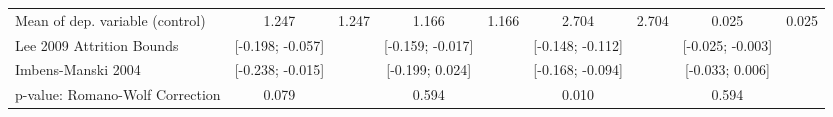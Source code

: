 {\begin{tabular}{l*{8}{c}}
Mean of dep. variable (control)                   &       1.247         &       1.247         &       1.166         &       1.166         &       2.704         &       2.704         &       0.025         &       0.025         \\
Lee 2009 Attrition Bounds                         &[-0.198; -0.057]         &                     &[-0.159; -0.017]         &                     &[-0.148; -0.112]         &                     &[-0.025; -0.003]         &                     \\
Imbens-Manski 2004                                &[-0.238; -0.015]         &                     &[-0.199; 0.024]         &                     &[-0.168; -0.094]         &                     &[-0.033; 0.006]         &                     \\
p-value: Romano-Wolf Correction                   &       0.079         &                     &       0.594         &                     &       0.010         &                     &       0.594         &                     \\
\hline\hline
\end{tabular}
}
